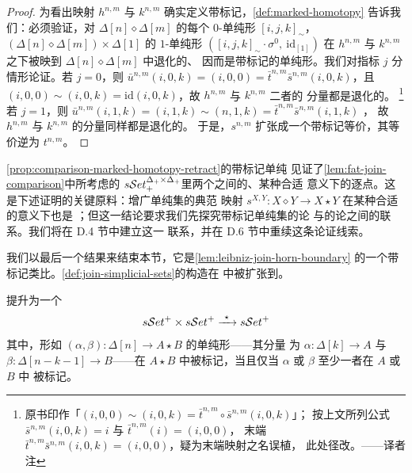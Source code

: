 \begin{proof}
为看出映射 $h^{n,m}$ 与 $k^{n,m}$ 确实定义带标记\trHomotopy，\cref{def:marked-homotopy}
告诉我们：必须验证，对 $\Delta[n]\diamond\Delta[m]$ 的每个 $0$-单纯形%
$[i,j,k]_{\sim}$，$(\Delta[n]\diamond\Delta[m])\times\Delta[1]$ 的%
$1$-单纯形 $([i,j,k]_{\sim}\cdot\sigma^{0},\ \mathrm{id}_{[1]})$ 在%
$h^{n,m}$ 与 $k^{n,m}$ 之下被映到 $\Delta[n]\diamond\Delta[m]$ 中退化的、%
因而是带标记的单纯形。我们对指标 $j$ 分情形论证。若 $j=0$，则
$\bar{u}^{n,m}(i,0,k)=(i,0,0)=\bar{t}^{n,m}\bar{s}^{n,m}(i,0,k)$，且%
$(i,0,0)\sim(i,0,k)=\mathrm{id}(i,0,k)$，故 $h^{n,m}$ 与 $k^{n,m}$ 二者的%
分量都是退化的。
\footnote{原书印作「$(i,0,0)\sim(i,0,k)=\bar{t}^{n,m}\circ\bar{s}^{n,m}(i,0,k)$」；
按上文所列公式 $\bar{s}^{n,m}(i,0,k)=i$ 与 $\bar{t}^{n,m}(i)=(i,0,0)$，%
末端 $\bar{t}^{n,m}\bar{s}^{n,m}(i,0,k)=(i,0,0)$，疑为末端映射之名误植，%
此处径改。——译者注}
若 $j=1$，则
$\bar{u}^{n,m}(i,1,k)=(i,1,k)\sim(n,1,k)=\bar{t}^{n,m}\bar{s}^{n,m}(i,1,k)$%
，%
故 $h^{n,m}$ 与 $k^{n,m}$ 的分量同样都是退化的。
于是，$s^{n,m}$ 扩张成一个带标记\trHomotopy{}\trRetract{}等价，其等价逆为%
$t^{n,m}$。
\end{proof}

\cref{prop:comparison-marked-homotopy-retract}的带标记单纯%
\trHomotopyEquivalence{}见证了\cref{lem:fat-join-comparison}中所考虑的%
$s\mathcal{S}et_{+}^{\Delta_{+}\times\Delta_{+}}$里两个\trDiagram{}之间的、某种合适
意义下的逐点\trWeakEquivalence。这是下述证明的关键原料：增广单纯集的典范
映射 $s^{X,Y}\colon X\diamond Y\to X\star Y$ 在某种合适的意义下也是%
\trWeakEquivalence；但这一结论要求我们先探究带标记单纯集的\trHomotopy{}论
与\trQuasiCategory{}的\trHomotopy{}论之间的联系。我们将在 D.4 节中建立这一
联系，并在 D.6 节中重续这条论证线索。

我们以最后一个结果来结束本节，它是\cref{lem:leibniz-join-horn-boundary}%
的一个带标记类比。\cref{def:join-simplicial-sets}的\trJoin{}构造在\cite{bib128}
中被扩张到\trMarkedSimplicialSet。

\begin{definition}\label{def:join-marked-simplicial-sets}
\trSimplicial\trJoin{}提升为一个\trJoin\trBifunctor
\begin{equation*}
\sSet^{+}\times\sSet^{+}\xrightarrow{\ \star\ }\sSet^{+}
\end{equation*}
其中，形如 $(\alpha,\beta)\colon\Delta[n]\to A\star B$ 的单纯形——其分量%
为 $\alpha\colon\Delta[k]\to A$ 与 $\beta\colon\Delta[n-k-1]\to B$——在%
$A\star B$ 中被标记，当且仅当 $\alpha$ 或 $\beta$ 至少一者在 $A$ 或 $B$ 中%
被标记。
\end{definition}

